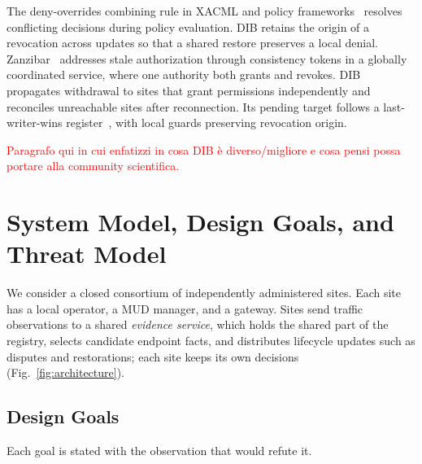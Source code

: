 \documentclass[journal]{IEEEtran}
\theoremstyle{definition}
\begin{document}
The deny-overrides combining rule in XACML and policy frameworks~\cite{xacml3} resolves conflicting decisions during policy evaluation. DIB retains the origin of a revocation across updates so that a shared restore preserves a local denial. Zanzibar~\cite{zanzibar} addresses stale authorization through consistency tokens in a globally coordinated service, where one authority both grants and revokes. DIB propagates withdrawal to sites that grant permissions independently and reconciles unreachable sites after reconnection. Its pending target follows a last-writer-wins register~\cite{crdt}, with local guards preserving revocation origin.

\textcolor{red}{Paragrafo qui in cui enfatizzi in cosa DIB è diverso/migliore e cosa pensi possa portare alla community scientifica.}


\section{System Model, Design Goals, and Threat Model}
\label{sec:threat}

We consider a closed consortium of independently administered sites. Each site has a local operator, a MUD manager, and a gateway. Sites send traffic observations to a shared \emph{evidence service}, which holds the shared part of the registry, selects candidate endpoint facts, and distributes lifecycle updates such as disputes and restorations; each site keeps its own decisions (Fig.~\ref{fig:architecture}).

\subsection{Design Goals}
\label{subsec:goals}
Each goal is stated with the observation that would refute it.
\end{document}
